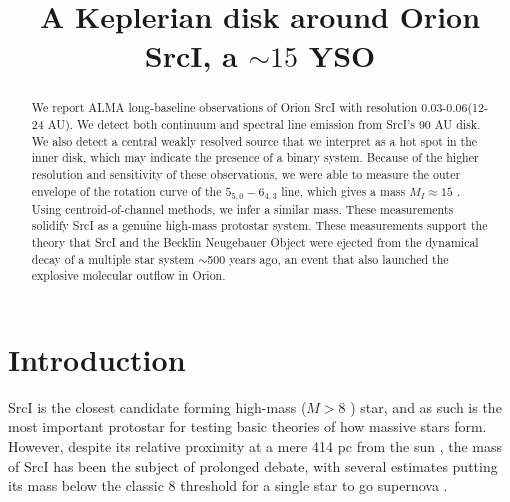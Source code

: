 \documentclass[twocolumn]{aastex61}
\newcommand{\sourcei}{SrcI\xspace}
\begin{document}


\title{A Keplerian disk around Orion \sourcei, a $\sim15$ \msun YSO}
\begin{abstract}
   We report ALMA long-baseline observations of Orion \sourcei with resolution
   0.03-0.06\arcsec (12-24 AU).
   We detect both continuum and spectral line emission from \sourcei's 90 AU disk.
   We also detect a central weakly resolved source that we interpret as a hot spot
   in the inner disk, which may indicate the presence of a binary system.
   Because of the higher resolution and sensitivity of these observations, we
   were able to measure the outer envelope of the rotation curve of the \water
   $5_{5,0}-6_{4,3}$ line, which gives a mass $M_I\approx15$ \msun.  Using
   centroid-of-channel methods,
   we infer a similar mass.
   These measurements solidify \sourcei as a genuine
   high-mass protostar system.
   These measurements support the theory that \sourcei and the Becklin
   Neugebauer Object were ejected from the dynamical decay of a multiple star
   system $\sim$500 years ago, an event that also launched the explosive
   molecular outflow in Orion.
\end{abstract}

\section{Introduction}
\sourcei is the closest candidate forming high-mass ($M>8$ \msun) star, 
and as such is the most important protostar for testing basic theories
of how massive stars form.  However, despite its relative proximity at
a mere 414 pc from the sun \citep{Menten2007a}, the mass of \sourcei
has been the subject of prolonged debate, with several estimates
putting
its mass below the classic 8 \msun threshold for a single star to go supernova
\citep[][]{Heger2003}.
\end{document}
